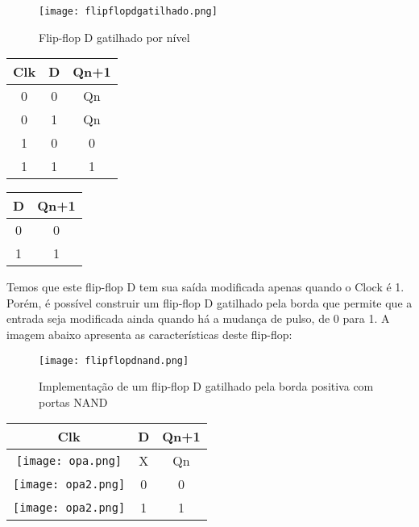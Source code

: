 \documentclass[12pt]{article}
\begin{document}
\begin{figure}[H]
	\centering
	\texttt{[image: flipflopdgatilhado.png]}
	\caption{Flip-flop D gatilhado por nível}
	\label{fig:flipflopd}
\end{figure}

\begin{table}[H]
	\centering
	\begin{tabular}{|c|c|c|}
		\cline{1-3}
		\multicolumn{1}{|c|}{Clk} & \multicolumn{1}{|c|}{D} & \multicolumn{1}{|c|}{Qn+1} \\
		\hline
		0 & 0 & Qn \\
		\hline
		0 & 1 & Qn \\
		\hline
		1 & 0 & 0 \\
		\hline
		1 & 1 & 1 \\
		\hline
	\end{tabular}
	
\end{table} 

\begin{table}[H]
	\centering
	\begin{tabular}{|c|c|}
		\cline{1-2}
		\multicolumn{1}{|c|}{D} & \multicolumn{1}{|c|}{Qn+1} \\
		\hline
		0 & 0 \\
		\hline
		1 & 1\\
		\hline
	\end{tabular}
	
\end{table} 


Temos que este flip-flop D tem sua saída modificada apenas quando o Clock é 1. Porém, é possível construir um flip-flop D gatilhado pela borda que permite que a entrada seja modificada ainda quando há a mudança de pulso, de 0 para 1. A imagem abaixo apresenta as características deste flip-flop:


\begin{figure}[H]
	\centering
	\texttt{[image: flipflopdnand.png]}
	\caption{Implementação de um flip-flop D gatilhado pela borda positiva com portas NAND}
	\label{fig:flipflpodnand}
\end{figure}

\begin{table}[H]
	\centering
	\begin{tabular}{|c|c|c|}
		\cline{1-3}
		\multicolumn{1}{|c|}{Clk} & \multicolumn{1}{|c|}{D} & \multicolumn{1}{|c|}{Qn+1} \\
		\hline
		\texttt{[image: opa.png]} & X & Qn \\
		\hline
		\texttt{[image: opa2.png]} & 0 & 0 \\
		\hline
		\texttt{[image: opa2.png]} & 1 & 1 \\
		\hline
	\end{tabular}
	
\end{table} 
\end{document}

